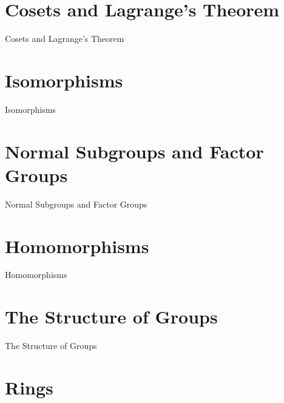 \section{Cosets and Lagrange’s Theorem}
\label{sec:cosets-and-lagrange-s-theorem}

Cosets and Lagrange’s Theorem

\section{Isomorphisms}
\label{sec:isomorphisms}

Isomorphisms

\section{Normal Subgroups and Factor Groups}
\label{sec:normal-subgroups-and-factor-groups}

Normal Subgroups and Factor Groups

\section{Homomorphisms}
\label{sec:homomorphisms}

Homomorphisms

\section{The Structure of Groups}
\label{sec:the-structure-of-groups}

The Structure of Groups

\section{Rings}
\label{sec:rings}

